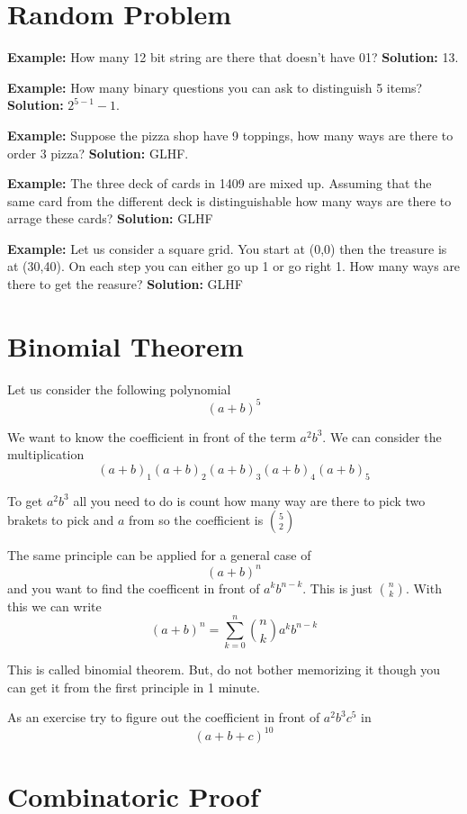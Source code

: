 \documentclass[a4paper, 12pt]{article}
\newcommand{\example}{\vspace{1em}\noindent\textbf{Example:} }
\newcommand{\solution}{\newline\noindent\textbf{Solution:} }
\begin{document}
\begin{multicols}{2}
	\section*{Random Problem}
	\example How many 12 bit string are there that doesn't have 01?
	\solution 13.
	
	\example How many binary questions you can ask to distinguish 5 items?
	\solution $2^{5-1} -1$.
	
	\example Suppose the pizza shop have 9 toppings, how many ways are there to order 3 pizza?
	\solution GLHF.
	
	\example The three deck of cards in 1409 are mixed up. Assuming that the same card from the different deck is distinguishable how many ways are there to arrage these cards?
	\solution GLHF
	
	\example Let us consider a square grid. You start at (0,0) then the treasure is at (30,40). On each step you can either go up 1 or go right 1. How many ways are there to get the reasure?
	\solution GLHF
	
	\section*{Binomial Theorem}
	Let us consider the following polynomial
	\[
		(a+b)^5
	\]
	
	We want to know the coefficient in front of the term $a^2b^3$. We can consider the multiplication
	\[
		(a+b)_1(a+b)_2(a+b)_3(a+b)_4(a+b)_5 
	\]
	
	To get $a^2b^3$ all you need to do is count how many way are there to pick two brakets to pick and $a$ from so the coefficient is $\displaystyle {5 \choose 2}$
	
	The same principle can be applied for a general case of\[
		(a+b)^n
	\]
	and you want to find the coefficent in front of $a^k b^{n-k}$. This is just $\displaystyle {n \choose k}$. With this we can write
	\[
		(a+b)^n = \sum_{k=0}^{n} {n \choose k} a^k b^{n-k}
	\]
	
	This is called binomial theorem. But, do not bother memorizing it though you can get it from the first principle in 1 minute.
	
	As an exercise try to figure out the coefficient in front of $a^2 b^3 c^5$ in
	\[
		(a + b + c)^{10}
	\]

	\section*{Combinatoric Proof}
	

\end{multicols}
\end{document}
